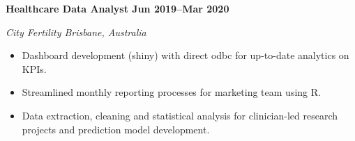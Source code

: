 \textbf{Healthcare Data Analyst \hfill Jun 2019--Mar 2020}\par
\textit{City Fertility \hfill Brisbane, Australia}\par
\begin{itemize}
	\item Dashboard development (shiny) with direct odbc for up-to-date analytics on KPIs.
	\item Streamlined monthly reporting processes for marketing team using R.
    \item Data extraction, cleaning and statistical analysis for clinician-led research projects and prediction model development.
\end{itemize}\par